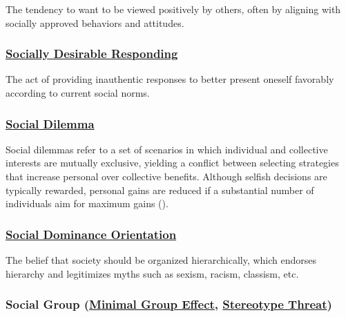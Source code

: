 \documentclass[
  letterpaper,
]{book}
\begin{document}
The tendency to want to be viewed positively by others, often by
aligning with socially approved behaviors and attitudes.

\subsubsection*{\texorpdfstring{\hyperref[def-sociallydesirableresponding]{Socially
Desirable
Responding}}{Socially Desirable Responding}}\label{socially-desirable-responding}

The act of providing inauthentic responses to better present oneself
favorably according to current social norms.

\subsubsection*{\texorpdfstring{\hyperref[def-socialdilemma]{Social
Dilemma}}{Social Dilemma}}\label{social-dilemma}

Social dilemmas refer to a set of scenarios in which individual and
collective interests are mutually exclusive, yielding a conflict between
selecting strategies that increase personal over collective benefits.
Although selfish decisions are typically rewarded, personal gains are
reduced if a substantial number of individuals aim for maximum gains
().

\subsubsection*{\texorpdfstring{\hyperref[def-sdo]{Social Dominance
Orientation}}{Social Dominance Orientation}}\label{social-dominance-orientation}

The belief that society should be organized hierarchically, which
endorses hierarchy and legitimizes myths such as sexism, racism,
classism, etc.

\subsubsection*{\texorpdfstring{Social Group
(\hyperref[def-socialgroup]{Minimal Group Effect},
\hyperref[def-socialgroup]{Stereotype
Threat})}{Social Group (Minimal Group Effect, Stereotype Threat)}}\label{social-group-minimal-group-effect-stereotype-threat}
\end{document}
